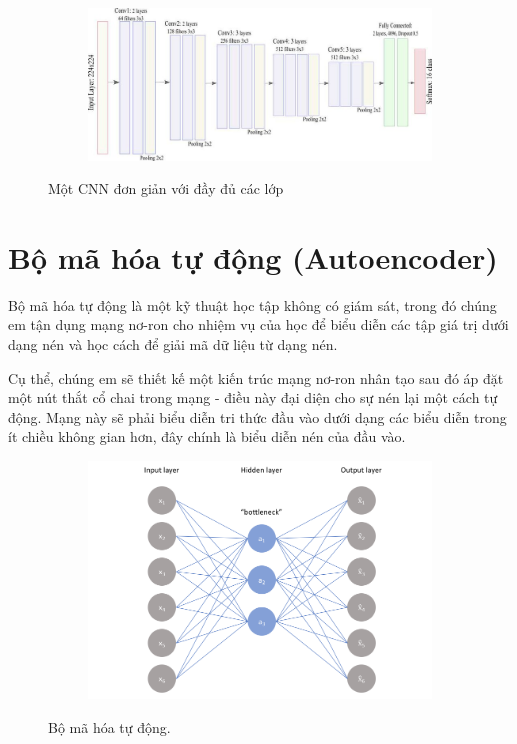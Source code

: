 \begin{figure}
    \begin{subfigure}{1.\textwidth}
        \begin{center}
            \includegraphics[width=1.\linewidth]{Chapters/items/chap2_8.jpg}
        \end{center}
        \label{fig: chap2_8}
    \end{subfigure}
    \caption{Một CNN đơn giản với đầy đủ các lớp}
\end{figure}

\newpage



\section{Bộ mã hóa tự động (Autoencoder)}

Bộ mã hóa tự động là một kỹ thuật học tập không có giám sát,
trong đó chúng em tận dụng mạng nơ-ron cho nhiệm vụ của học để biểu diễn các tập
giá trị dưới dạng nén và học cách để giải mã dữ liệu từ dạng nén.

Cụ thể, chúng em sẽ thiết kế một kiến trúc mạng nơ-ron nhân tạo sau đó áp đặt một
nút thắt cổ chai trong mạng - điều này đại diện cho sự nén lại một cách tự động.
Mạng này sẽ phải biểu diễn tri thức đầu vào dưới dạng các biểu diễn trong ít
chiều không gian hơn, đây chính là biểu diễn nén của đầu vào.

\begin{figure}
    \begin{subfigure}{0.8\textwidth}
        \includegraphics[width=1.0\linewidth]{Chapters/items/autoencoder1.png}
        \caption{}
        \label{fig: auto1}
    \end{subfigure}
    \caption{Bộ mã hóa tự động.}
\end{figure}

